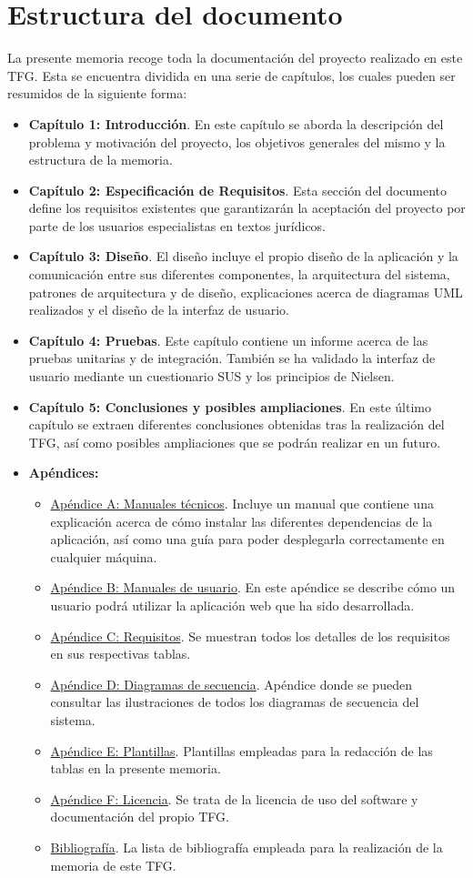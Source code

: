 \section{Estructura del documento}
La presente memoria recoge toda la documentación del proyecto realizado en este TFG. Esta se encuentra dividida en una serie de capítulos, los cuales pueden ser resumidos de la siguiente forma:
\begin{itemize}
\item {\bf Capítulo 1: Introducción}. En este capítulo se aborda la descripción del problema y motivación del proyecto, los objetivos generales del mismo y la estructura de la memoria.
\item {\bf Capítulo 2: Especificación de Requisitos}. Esta sección del documento define los requisitos existentes que garantizarán la aceptación del proyecto por parte de los usuarios especialistas en textos jurídicos.
\item {\bf Capítulo 3: Diseño}. El diseño incluye el propio diseño de la aplicación y la comunicación entre sus diferentes componentes, la arquitectura del sistema, patrones de arquitectura y de diseño, explicaciones acerca de diagramas UML realizados y el diseño de la interfaz de usuario.
\item {\bf Capítulo 4: Pruebas}. Este capítulo contiene un informe acerca de las pruebas unitarias y de integración. También se ha validado la interfaz de usuario mediante un cuestionario SUS y los principios de Nielsen.
\item {\bf Capítulo 5: Conclusiones y posibles ampliaciones}. En este último capítulo se extraen diferentes conclusiones obtenidas tras la realización del TFG, así como posibles ampliaciones que se podrán realizar en un futuro.
\item {\bf Apéndices:}
\begin{itemize}
\item \underline{Apéndice A: Manuales técnicos}. Incluye un manual que contiene una explicación acerca de cómo instalar las diferentes dependencias de la aplicación, así como una guía para poder desplegarla correctamente en cualquier máquina.
\item \underline{Apéndice B: Manuales de usuario}. En este apéndice se describe cómo un usuario podrá utilizar la aplicación web que ha sido desarrollada.
\item \underline{Apéndice C: Requisitos}. Se muestran todos los detalles de los requisitos en sus respectivas tablas.
\item \underline{Apéndice D: Diagramas de secuencia}. Apéndice donde se pueden consultar las ilustraciones de todos los diagramas de secuencia del sistema.
\item \underline{Apéndice E: Plantillas}. Plantillas empleadas para la redacción de las tablas en la presente memoria.
\item \underline{Apéndice F: Licencia}. Se trata de la licencia de uso del software y documentación del propio TFG.
\item \underline{Bibliografía}. La lista de bibliografía empleada para la realización de la memoria de este TFG.
\end{itemize}
\end{itemize}
